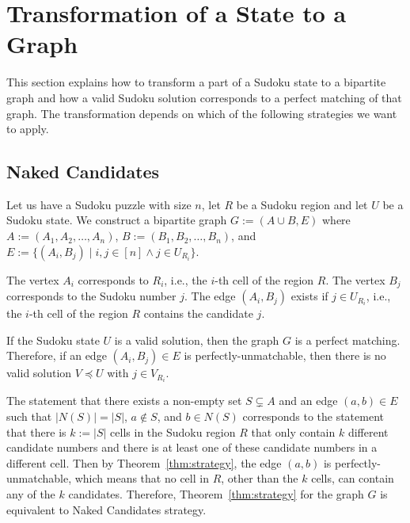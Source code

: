\section{Transformation of a State to a Graph}\label{sec:trans}

This section explains how to transform a part of a Sudoku state to a bipartite graph and how
a valid Sudoku solution corresponds to a perfect matching of that graph.
The transformation depends on which of the following strategies we want to apply.

\subsection*{Naked Candidates}

Let us have a Sudoku puzzle with size $n$, let $R$ be a Sudoku region and let $U$ be a Sudoku state.
We construct a bipartite graph $G := (A \cup B, E)$ where
$A := (A_1, A_2, \dots, A_n)$, $B := (B_1, B_2, \dots, B_n)$, and
$E := \{(A_i, B_j) \mid i, j \in [n] \land j \in U_{R_i}\}$.

The vertex $A_i$ corresponds to $R_i$, i.e., the $i$-th cell of the region $R$.
The vertex $B_j$ corresponds to the Sudoku number $j$.
The edge $(A_i, B_j)$ exists if $j \in U_{R_i}$, i.e., the $i$-th cell of the region $R$ contains the candidate $j$.


If the Sudoku state $U$ is a valid solution, then the graph $G$ is a perfect matching.
Therefore, if an edge $(A_i, B_j) \in E$ is perfectly-unmatchable,
then there is no valid solution $V \preceq U$ with $j \in V_{R_i}$.

The statement that there exists a non-empty set $S \subsetneq A$ and an edge $(a, b) \in E$
such that $\left|N(S)\right| = \left|S\right|$, $a \notin S$, and $b \in N(S)$ corresponds to the statement that
there is $k := \left|S\right|$ cells in the Sudoku region $R$ that only contain $k$ different candidate numbers
and there is at least one of these candidate numbers in a different cell.
Then by Theorem~\ref{thm:strategy}, the edge $(a, b)$ is perfectly-unmatchable,
which means that no cell in $R$, other than the $k$ cells, can contain any of the $k$ candidates.
Therefore, Theorem~\ref{thm:strategy} for the graph $G$ is equivalent to Naked Candidates strategy.


